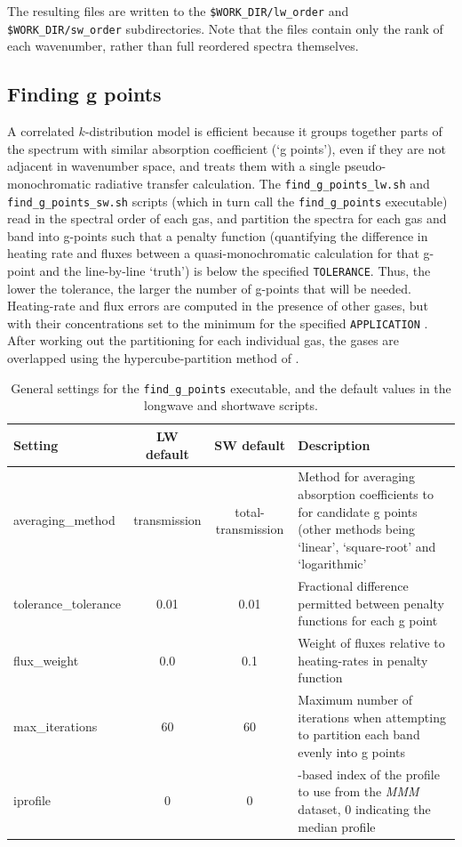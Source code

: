 \documentclass[a4,oneside]{article}
\def\codesize{\small}
\def\codesize{\small}
\def\code#1{{\codesize\texttt{#1}}}
\begin{document}
The resulting files are written to the \code{\$WORK\_DIR/lw\_order}
and \code{\$WORK\_DIR/sw\_order} subdirectories.  Note that the files
contain only the rank of each wavenumber, rather than full reordered
spectra themselves.

\subsection{Finding g points}
A correlated $k$-distribution model is efficient because it groups
together parts of the spectrum with similar absorption coefficient (`g
points'), even if they are not adjacent in wavenumber space, and
treats them with a single pseudo-monochromatic radiative transfer
calculation.  The \code{find\_g\_points\_lw.sh} and
\code{find\_g\_points\_sw.sh} scripts (which in turn call the
\code{find\_g\_points} executable) read in the spectral order of each
gas, and partition the spectra for each gas and band into g-points
such that a penalty function (quantifying the difference in heating
rate and fluxes between a quasi-monochromatic calculation for that
g-point and the line-by-line `truth') is below the specified
\code{TOLERANCE}. Thus, the lower the tolerance, the larger the number
of g-points that will be needed. Heating-rate and flux errors are
computed in the presence of other gases, but with their concentrations
set to the minimum for the specified \code{APPLICATION} \citep[for all
applications the minimum water vapour and ozone are taken from the
\emph{MMM} dataset, while for the climate application the greenhouse
gas concentrations are set to the minima of the scenarios listed in
Table 2 of][]{Hogan&2020}.  After working out the partitioning for
each individual gas, the gases are overlapped using the
hypercube-partition method of \cite{Hogan2010}.

\begin{table}[tb!]
\caption{\label{tab:find_g_points}General settings for the
  \code{find\_g\_points} executable, and the default values in the
  longwave and shortwave scripts.}
\begin{center}
\begin{tabular}{lcc>{\raggedright\arraybackslash}p{7cm}}
\hline
Setting & LW default & SW default & Description\\
\hline
averaging\_method & transmission & total-transmission & Method for averaging absorption coefficients to for candidate g points (other methods being `linear', `square-root' and `logarithmic' \\
tolerance\_tolerance & 0.01 & 0.01 & Fractional difference permitted between penalty functions for each g point \\
flux\_weight & 0.0 & 0.1 & Weight of fluxes relative to heating-rates in penalty function \\
max\_iterations & 60 & 60 & Maximum number of iterations when attempting to partition each band evenly into g points\\
iprofile & 0 & 0 & 0-based index of the profile to use from the \emph{MMM} dataset, 0 indicating the median profile\\
\hline
\end{tabular}
\end{center}
\end{table}
\end{document}
